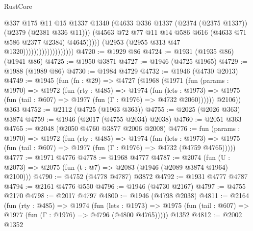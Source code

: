 \begin{lexlean}{RustCore}
\begin{coremodule}
                                              @337
                                              @175
                                              @11
                                              @15
                                              @1337
                                              @1340
                                              (@4633
                                                @336
                                                @1337
                                                (@2374 (@2375 @1337))
                                                (@2379 (@2381 @336 @11)))
                                              (@4563
                                                @72
                                                @77
                                                @11
                                                @14
                                                @586
                                                @616
                                                (@4633 @71 @586 @2377 @2384)
                                                @4645)))))
                                      (@2953 (@2955 @313 @47 @1320)))))))))))))))))))
@4720 := @1929 @86
@4724 := @1931 (@1935 @86) (@1941 @86)
@4725 := @1950 @3871
@4727 := @1946 (@4725 @1965)
@4729 := @1988 (@1989 @86)
@4730 := @1984 @4729
@4732 := @1946 (@4730 @2013)
@4749 := @1945
    (fun (fn : @29) =>
    @4727
      (@1968
        (@1971
          (fun (params : @1970) =>
          @1972
            (fun (rty : @485) =>
            @1974
              (fun (lets : @1973) =>
              @1975 (fun (tail : @607) => @1977 (fun (Γ : @1976) => @4732 @2060))))))
        @2106))
    @363
@4752 := @2112 (@4725 (@1963 @363))
@4755 := @2025 (@2026 @363) @3874
@4759 := @1946 (@2017 (@4755 @2034) @2038)
@4760 := @2051 @363
@4765 := @2048 (@2050 @4760 @3877 @2006 @2008)
@4776 := fun (params : @1970) =>
  @1972
    (fun (rty : @485) =>
    @1974
      (fun (lets : @1973) =>
      @1975 (fun (tail : @607) => @1977 (fun (Γ : @1976) => @4732 (@4759 @4765)))))
@4777 := @1971 @4776
@4778 := @1968 @4777
@4787 := @2074 (fun (U : @2073) => @2075 (fun (t : @7) => @2083 (@1946 (@2089 @3874 @1964) @2100)))
@4790 := @4752 (@4778 @4787) @3872
@4792 := @1931 @4777 @4787
@4794 := @2161 @4776 @550
@4796 := @1946 (@4730 @2167)
@4797 := @4755 @2170
@4798 := @2017 @4797
@4800 := @1946 (@4798 @2038)
@4811 := @2164
    (fun (rty : @485) =>
    @1974
      (fun (lets : @1973) =>
      @1975 (fun (tail : @607) => @1977 (fun (Γ : @1976) => @4796 (@4800 @4765)))))
    @1352
@4812 := @2002 @1352

\end{coremodule}
\end{lexlean}

